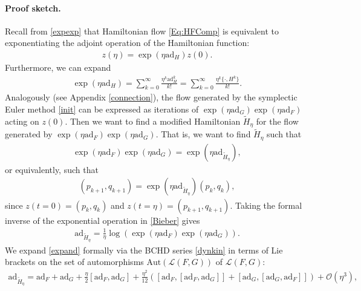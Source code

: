 \documentclass[11pt]{article}
\newcommand{\ad}{\mathrm{ad}}
\begin{document}
\paragraph{Proof sketch.} Recall from \eqref{expexp} that Hamiltonian flow \eqref{Eq:HFComp} is equivalent to exponentiating the adjoint operation of the Hamiltonian function:
\begin{align*}
z(\eta)=\exp\left(\eta\ad_{H}\right)z(0).
\end{align*}
Furthermore, we can expand
\begin{gather}
    \exp\left(\eta\ad_{H}\right)=\sum_{k=0}^{\infty}{\frac{\eta^{k}\ad_{H}^{k}}{k!}} = \sum_{k=0}^{\infty}{\frac{\eta^{k}\{\cdot, H^k\}}{k!}}.
\end{gather}
Analogously (see Appendix \ref{connection}), the flow generated by the symplectic Euler method \eqref{init} can be expressed as iterations of $\exp\left(\eta \ad_{G}\right)\exp\left(\eta \ad_{F}\right)$ acting on $z(0)$. 
Then we want to find a modified Hamiltonian $\widetilde{H}_{\eta}$ for the flow generated by $\exp\left(\eta \ad_{F}\right)\exp\left(\eta \ad_{G}\right)$.
That is, we want to find $\widetilde{H}_{\eta}$ such that
\begin{align}
    \exp\left(\eta \ad_{F}\right)\exp\left(\eta \ad_{G}\right)=\exp\left(\eta \ad_{\widetilde{H}_{\eta}}\right),\label{Bieber}
\end{align}
or equivalently, such that
\begin{align}
    \left(p_{k+1},q_{k+1}\right)=\exp\left(\eta \ad_{\widetilde{H}_{\eta}}\right)\left(p_{k},q_{k}\right),\nonumber
\end{align}
since $z(t=0)=\left(p_{k},q_{k}\right)$ and $z\left(t=\eta\right)=\left(p_{k+1},q_{k+1}\right)$. Taking the formal inverse of the exponential operation in \eqref{Bieber} gives
\begin{align}
\ad_{\widetilde{H}_{\eta}}=\frac{1}{\eta}\log\left(\exp\left(\eta \ad_{F}\right)\exp\left(\eta \ad_{G}\right)\right).\label{expand}
\end{align}
We expand \eqref{expand} formally via the BCHD series \ref{dynkin} in terms of Lie brackets on the set of automorphisms $\textrm{Aut}\left(\mathcal{L}\left(F,G\right)\right)$ of $\mathcal{L}\left(F,G\right)$:
\begin{gather}
    \ad_{\widetilde{H}_{\eta}}=\ad_{F}+\ad_{G}+\frac{\eta}{2}\left[\ad_{F},\ad_{G}\right]+\frac{\eta^{2}}{12}\left(\left[\ad_{F},\left[\ad_{F},\ad_{G}\right]\right]+\left[\ad_{G},\left[\ad_{G},\ad_{F}\right]\right]\right)+\mathcal{O}\left(\eta^{3}\right),\label{fin}
\end{gather}
\end{document}
